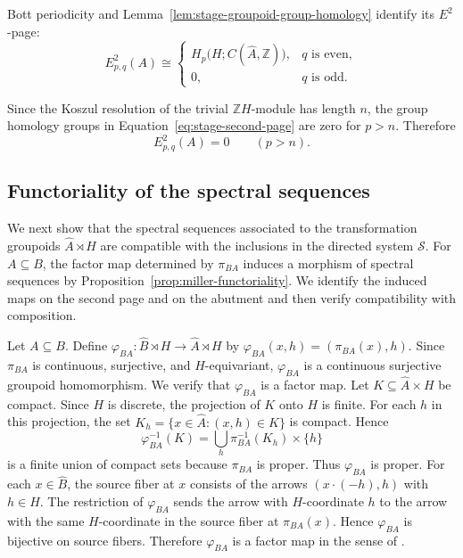 \documentclass[pdflatex,sn-mathphys-num]{sn-jnl}%
\theoremstyle{plain}
\theoremstyle{remark}
\theoremstyle{definition}
\numberwithin{equation}{section}
\begin{document}
Bott periodicity and Lemma~\ref{lem:stage-groupoid-group-homology} identify its \( E^2 \)-page:
\begin{equation}
\label{eq:stage-second-page}
E^2_{p,q}(A)
\cong
\begin{cases}
H_p\bigl(H;C(\widehat A,\mathbb Z)\bigr), & q \text{ is even},\\
0, & q \text{ is odd}.
\end{cases}
\end{equation}

Since the Koszul resolution of the trivial \( \mathbb ZH \)-module has length \( n \), the group homology groups in Equation~\eqref{eq:stage-second-page} are zero for \( p>n \). Therefore
\begin{equation}
\label{eq:stage-horizontal-bound}
E^2_{p,q}(A)=0
\qquad
(p>n).
\end{equation}

\subsection{Functoriality of the spectral sequences}

We next show that the spectral sequences associated to the transformation groupoids \( \widehat A\rtimes H \) are compatible with the inclusions in the directed system \( \mathcal S \). For \( A\subseteq B \), the factor map determined by \( \pi_{BA} \) induces a morphism of spectral sequences by Proposition~\ref{prop:miller-functoriality}. We identify the induced maps on the second page and on the abutment and then verify compatibility with composition.

Let \( A\subseteq B \). Define \( \varphi_{BA}\colon\widehat B\rtimes H\to\widehat A\rtimes H \) by \( \varphi_{BA}(x,h)=(\pi_{BA}(x),h) \). Since \( \pi_{BA} \) is continuous, surjective, and \( H \)-equivariant, \( \varphi_{BA} \) is a continuous surjective groupoid homomorphism. We verify that \( \varphi_{BA} \) is a factor map. Let \( K\subseteq\widehat A\times H \) be compact. Since \( H \) is discrete, the projection of \( K \) onto \( H \) is finite. For each \( h \) in this projection, the set \( K_h=\{x\in\widehat A:(x,h)\in K\} \) is compact. Hence
\[
\varphi_{BA}^{-1}(K)
=
\bigcup_h
\pi_{BA}^{-1}(K_h)\times\{h\}
\]
is a finite union of compact sets because \( \pi_{BA} \) is proper. Thus \( \varphi_{BA} \) is proper. For each \( x\in\widehat B \), the source fiber at \( x \) consists of the arrows \( (x\cdot(-h),h) \) with \( h\in H \). The restriction of \( \varphi_{BA} \) sends the arrow with \( H \)-coordinate \( h \) to the arrow with the same \( H \)-coordinate in the source fiber at \( \pi_{BA}(x) \). Hence \( \varphi_{BA} \) is bijective on source fibers. Therefore \( \varphi_{BA} \) is a factor map in the sense of \cite[Example~3.6]{miller2023functors}.
\end{document}
